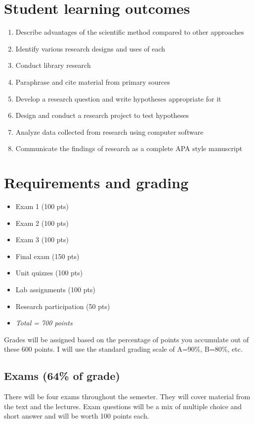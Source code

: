 \documentclass[10pt]{article}
\begin{document}
\section*{Student learning outcomes}
\label{sec-4}

\begin{enumerate}
\item Describe advantages of the scientific method compared to other approaches
\item Identify various research designs and uses of each
\item Conduct library research
\item Paraphrase and cite material from primary sources
\item Develop a research question and write hypotheses appropriate for it
\item Design and conduct a research project to test hypotheses
\item Analyze data collected from research using computer software
\item Communicate the findings of research as a complete APA style manuscript
\end{enumerate}

\section*{Requirements and grading}
\label{sec-5}

\begin{itemize}
\item Exam 1 (100 pts)
\item Exam 2 (100 pts)
\item Exam 3 (100 pts)
\item Final exam (150 pts)
\item Unit quizzes (100 pts)
\item Lab assignments (100 pts)
\item Research participation (50 pts)
\item \emph{Total = 700 points}
\end{itemize}

Grades will be assigned based on the percentage of points you accumulate out of these 600 points.  I will use the standard grading scale of A=90\%, B=80\%, etc.

\subsection*{Exams (64\% of grade)}
\label{sec-5-1}
There will be four exams throughout the semester.  They will cover material from the text and the lectures.  Exam questions will be a mix of multiple choice and short answer and will be worth 100 points each.
\end{document}
